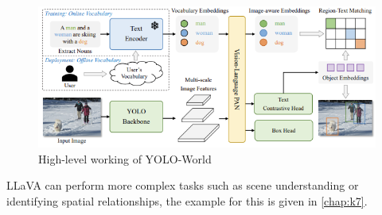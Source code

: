\begin{figure}[ht!]
    \centering
    \includegraphics[width=\textwidth]{content/images/YOLOWorld.png}
    \caption{High-level working of YOLO-World \cite{cheng2024yolow}}
    \label{fig:llava}
\end{figure}
 LLaVA can perform more complex tasks such as scene understanding or identifying spatial relationships, the example for this is given in \cref{chap:k7}.

